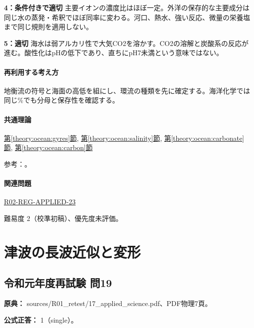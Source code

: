 \noindent\textbf{4：条件付きで適切} 主要イオンの濃度比はほぼ一定。外洋の保存的な主要成分は同じ水の蒸発・希釈でほぼ同率に変わる。河口、熱水、強い反応、微量の栄養塩まで同じ規則を適用しない。\par

\noindent\textbf{5：適切} 海水は弱アルカリ性で大気CO2を溶かす。CO2の溶解と炭酸系の反応が進む。酸性化はpHの低下であり、直ちにpH7未満という意味ではない。\par

\paragraph{再利用する考え方} 地衡流の符号と海面の高低を組にし、環流の種類を先に確定する。海洋化学では同じ\%でも分母と保存性を確認する。

\paragraph{共通理論} \hyperref[theory:ocean:gyres]{第\ref*{theory:ocean:gyres}節}, \hyperref[theory:ocean:salinity]{第\ref*{theory:ocean:salinity}節}, \hyperref[theory:ocean:carbonate]{第\ref*{theory:ocean:carbonate}節}, \hyperref[theory:ocean:carbon]{第\ref*{theory:ocean:carbon}節}

\par 参考：\cite{noaa_subtropical_ecco,noaa_sea_salt,feely_carbonate2004,noaa_carbon_chemistry,noaa_ccd_definition}。

\paragraph{関連問題} \hyperref[q:r02-reg-applied-23]{R02-REG-APPLIED-23}

\par 難易度 2（校準初稿）、優先度未評価。

\section{津波の長波近似と変形}

\subsection{令和元年度再試験 問19}
\label{q:r01-ret-applied-19}

\noindent\textbf{原典：} sources/R01\_retest/17\_applied\_science.pdf、PDF物理7頁。

\textbf{公式正答：} 1（single）。

